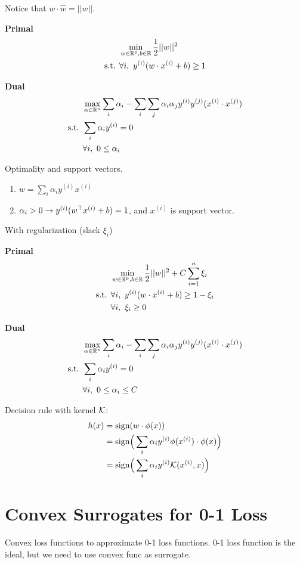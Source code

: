 \documentclass[a4paper]{report}
\begin{document}
Notice that $w \cdot \hat w=||w||$.

\textbf{Primal}
\begin{align*}
& \min_{w\in \mathbb{R}^p, b\in \mathbb{R}} \frac{1}{2}||w||^2\\ 
\text{s.t. } & \forall i,~ y^{(i)}(w \cdot x^{(i)}+b)\geq 1 
\end{align*}

\textbf{Dual}
\begin{align*}
& \max_{\alpha \in \mathbb{R}^n} \sum_i \alpha_i -\sum_i\sum_j \alpha_i \alpha_j y^{(i)}y^{(j)}(x^{(i)}\cdot x^{(j)}) \\
\text{s.t. } & \sum_i \alpha_i y^{(i)} = 0\\
& \forall i,~ 0\leq\alpha_i 
\end{align*}

Optimality and support vectors. 
\begin{enumerate}
\item $w=\sum_i \alpha_i y^{(i)} x^{(i)}$ 
\item $\alpha_i >0 \rightarrow y^{(i)}(w^\top x^{(i)}+b)=1$, and $x^{(i)}$ is support vector.
\end{enumerate}

With regularization (slack $\xi_i$)

\textbf{Primal}
\begin{align*}
& \min_{w\in \mathbb{R}^p, b\in \mathbb{R}} \frac{1}{2}||w||^2+C\sum_{i=1}^n\xi_i\\ 
\text{s.t. } & \forall i,~ y^{(i)}(w \cdot x^{(i)}+b)\geq 1 -\xi_i \\
& \forall i,~\xi_i \geq 0
\end{align*}

\textbf{Dual}
\begin{align*}
& \max_{\alpha \in \mathbb{R}^n} \sum_i \alpha_i -\sum_i\sum_j \alpha_i \alpha_j y^{(i)}y^{(j)}(x^{(i)}\cdot
x^{(j)}) \\
\text{s.t. } & \sum_i \alpha_i y^{(i)} = 0\\
& \forall i,~0\leq \alpha_i \leq C
\end{align*}

Decision rule with kernel $\mathcal{K}$: 
\begin{align*}
h(x) &= \text{sign}(w \cdot \phi(x))  \\
&= \text{sign}\Big(\sum_i \alpha_iy^{(i)} \phi(x^{(i)}) \cdot \phi(x)\Big) \\
&= \text{sign}\Big(\sum_i \alpha_i y^{(i)} \mathcal{K}(x^{(i)}, x)\Big)
\end{align*}

\section{Convex Surrogates for 0-1 Loss}
Convex loss functions to approximate 0-1 loss functions. 0-1 loss function is the ideal, but we need to use convex func as surrogate.
\end{document}
